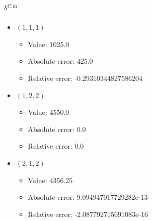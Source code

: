 \documentclass{article}%
\begin{document}
\subsection{$b^{\textsl{C},\text{in}}$}%
\begin{itemize}%
	\item $(1, 1, 1)$%
	\begin{itemize}%
		\item Value: 1025.0%
		\item Absolute error: 425.0%
		\item Relative error: -0.29310344827586204%
	\end{itemize}%
	\item $(1, 2, 2)$%
	\begin{itemize}%
		\item Value: 4550.0%
		\item Absolute error: 0.0%
		\item Relative error: 0.0%
	\end{itemize}%
	\item $(2, 1, 2)$%
	\begin{itemize}%
		\item Value: 4356.25%
		\item Absolute error: 9.094947017729282e-13%
		\item Relative error: -2.087792715691083e-16%
	\end{itemize}%
\end{itemize}%
\end{document}
